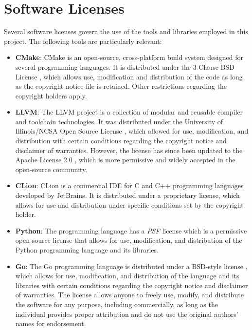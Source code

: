 \section{Software Licenses}
\label{sec:software-licenses}
Several software licenses govern the use of the tools and libraries employed in this project. The following tools are particularly relevant:
\begin{itemize}
    \item \textbf{CMake}: CMake is an open-source, cross-platform build system designed for several programming languages. It is distributed under the 3-Clause BSD License \cite{bsd3}, which allows use, modification and distribution of the code as long as the copyright notice file is retained. Other restrictions regarding the copyright holders apply.
    \item \textbf{LLVM}: The LLVM project is a collection of modular and reusable compiler and toolchain technologies. It was distributed under the University of Illinois/\gls{NCSA} Open Source License \cite{llvm-license-old}, which allowed for use, modification, and distribution with certain conditions regarding the copyright notice and disclaimer of warranties. However, the license has since been updated to the Apache License 2.0 \cite{llvm-license-new}, which is more permissive and widely accepted in the open-source community.
    \item \textbf{CLion}: CLion is a commercial \gls{IDE} for C and C++ programming languages developed by JetBrains. It is distributed under a proprietary license, which allows for use and distribution under specific conditions set by the copyright holder. \cite{clion-license}
    \item \textbf{Python}: The programming language has a \textit{PSF} license \cite{python-license} which is a permissive open-source license that allows for use, modification, and distribution of the Python programming language and its libraries.
    \item \textbf{Go}: The Go programming language is distributed under a BSD-style license \cite{go-license}, which allows for use, modification, and distribution of the language and its libraries with certain conditions regarding the copyright notice and disclaimer of warranties. The license allows anyone to freely use, modify, and distribute the software for any purpose, including commercially, as long as the individual provides proper attribution and do not use the original authors' names for endorsement.
\end{itemize}

